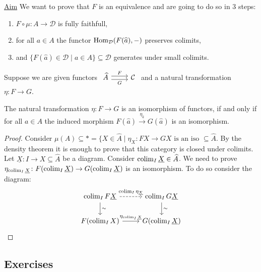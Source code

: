 \underline{Aim}
We want to prove that $F$ is an equivalence and are going to do so in 3 steps:
\begin{enumerate}
    \item 
    $F \circ \mu \colon A  \to \mathcal{D}$ is fully faithfull,
    \item 
    for all $a \in A$ the functor $\operatorname{Hom}_{\mathcal{D}}(F(\widehat{a}),-)$ preserves colimits,
    \item 
    and $\{F(\widehat{a}) \in \mathcal{D} \mid a \in A \} \subseteq \mathcal{D}$ generates under small colimits.
\end{enumerate}
Suppose we are given functors $\begin{tikzcd} \widehat{A} \ar[r, shift left , "F"] \ar[r, shift right, "G"'] & \mathcal{C}\end{tikzcd}$ and a natural transformation $\eta:F \to G$.

\begin{prop}
    The natural transformation $\eta: F \to G$ is an isomorphism of functors, if and only if for all $a \in A$ the induced morphism $F(\widehat{a}) \xrightarrow{\eta_{\widehat{a}}} G(\widehat{a})$ is an isomorphism.
\end{prop}

\begin{proof}
    Consider $\mu(A) \subseteq * = \{ X \in  \widehat{A} \mid  \eta_X \colon FX \to GX \text{ is an iso } \subseteq \widehat{A}$.
    By the density theorem it is enough to prove that this category is closed under colimits.
    Let $\underline{X} \colon I \to X \subseteq \widehat{A}$ be a diagram.
    Consider $\operatorname{colim}_I \underline{X} \in \widehat{A}$. 
    We need to prove $\eta_{\operatorname{colim}_I \underline{X}} \colon F(\operatorname{colim}_I \underline{X}) \to G(\operatorname{colim}_I \underline{X})$ is an isomorphism.
    To do so consider the diagram:
    \[
    \begin{tikzcd}
        \colim_I F\underline{X}
        \ar[r, dashed, "\colim_I \eta_{\underline{X}}"]
        \ar[d,"\sim"]
        &
        \colim_I G\underline{X}
        \ar[d, "\sim"]
        \\
        F(\colim_I X) 
        \ar[r, "\eta_{\colim_I \underline{X}}"]
        &
        G(\colim_I \underline{X})
    \end{tikzcd}
    \]
\end{proof}

\subsection{Exercises}

